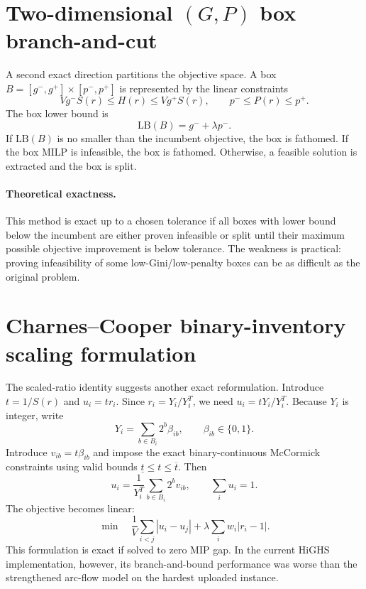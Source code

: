 \documentclass[11pt]{article}
\begin{document}
\section{Two-dimensional $(G,P)$ box branch-and-cut}

A second exact direction partitions the objective space.  A box $B=[g^-,g^+]\times[p^-,p^+]$ is represented by the linear constraints
\begin{equation}
    Vg^-S(r)\le H(r)\le Vg^+S(r),
    \qquad
    p^-\le P(r)\le p^+.
\end{equation}
The box lower bound is
\begin{equation}
    \mathrm{LB}(B)=g^-+\lambda p^-.
\end{equation}
If $\mathrm{LB}(B)$ is no smaller than the incumbent objective, the box is fathomed.  If the box MILP is infeasible, the box is fathomed.  Otherwise, a feasible solution is extracted and the box is split.

\paragraph{Theoretical exactness.}
This method is exact up to a chosen tolerance if all boxes with lower bound below the incumbent are either proven infeasible or split until their maximum possible objective improvement is below tolerance.  The weakness is practical: proving infeasibility of some low-Gini/low-penalty boxes can be as difficult as the original problem.

\section{Charnes--Cooper binary-inventory scaling formulation}

The scaled-ratio identity suggests another exact reformulation.  Introduce $t=1/S(r)$ and $u_i=t r_i$.  Since $r_i=Y_i/Y_i^T$, we need $u_i=tY_i/Y_i^T$.  Because $Y_i$ is integer, write
\begin{equation}
    Y_i=\sum_{b\in B_i}2^b \beta_{ib}, \qquad \beta_{ib}\in\{0,1\}.
\end{equation}
Introduce $v_{ib}=t\beta_{ib}$ and impose the exact binary-continuous McCormick constraints using valid bounds $\underline{t}\le t\le\overline{t}$.  Then
\begin{equation}
    u_i=\frac{1}{Y_i^T}\sum_{b\in B_i}2^b v_{ib},
    \qquad \sum_i u_i=1.
\end{equation}
The objective becomes linear:
\begin{equation}
    \min \quad \frac{1}{V}\sum_{i<j}|u_i-u_j| + \lambda\sum_i w_i|r_i-1|.
\end{equation}
This formulation is exact if solved to zero MIP gap.  In the current HiGHS implementation, however, its branch-and-bound performance was worse than the strengthened arc-flow model on the hardest uploaded instance.
\end{document}
